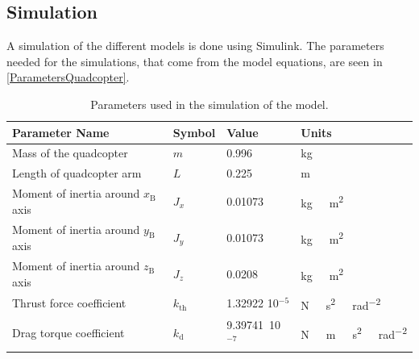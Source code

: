 \subsection{Simulation}
A simulation of the different models is done using Simulink. The parameters needed for the simulations, that come from the model equations, are seen in \autoref{ParametersQuadcopter}.
\vspace{0 cm}
\begin{table}[H]
	\centering
	\begin{tabular}{|l|l|l|l|}
		\hline %
		\textbf{Parameter Name}         &\textbf{Symbol} &\textbf{Value}          &\textbf{Units}             \\
		\hline %
		Mass of the quadcopter          & $m$            & 0.996             & \si{kg}                   \\
		\hline %
    Length of quadcopter arm        & $L$            & 0.225            & \si{m}                    \\
    \hline %
		Moment of inertia around $x_{\mathrm{B}}$ axis & $J_x$          & 0.01073           & \si{kg\ m^2}              \\
		\hline %
		Moment of inertia around $y_{\mathrm{B}}$ axis & $J_y$          & 0.01073           & \si{kg\ m^2}              \\
		\hline %
		Moment of inertia around $z_{\mathrm{B}}$ axis & $J_z$          & 0.0208           & \si{kg\ m^2}              \\
		\hline %
		Thrust force coefficient        & $k_{\mathrm{th}}$       & 1.32922 10$^{-5}$  & \si{N\ s^2\ rad^{-2}}     \\
		\hline %
		Drag torque coefficient         & $k_{\mathrm{d}}$        & 9.39741\ 10$^{-7}$  & \si{N\ m\  s^2\ rad^{-2}} \\
		\hline %
	\end{tabular}
	\caption{Parameters used in the simulation of the model.}
	\label{ParametersQuadcopter}
\end{table}\vspace{-18pt}
